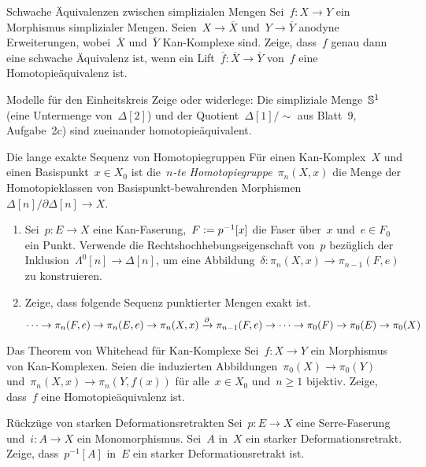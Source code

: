 \documentclass{uebblatt}
\begin{document}

\begin{aufgabe}{Schwache Äquivalenzen zwischen simplizialen Mengen}
Sei~$f : X \to Y$ ein Morphismus simplizialer Mengen. Seien~$X \to
\overline{X}$ und~$Y \to \overline{Y}$ anodyne Erweiterungen,
wobei~$\overline{X}$ und~$\overline{Y}$ Kan-Komplexe sind. Zeige, dass~$f$
genau dann eine schwache Äquivalenz ist, wenn ein Lift~$\overline{f} :
\overline{X} \to \overline{Y}$ von~$f$ eine Homotopieäquivalenz ist.
\end{aufgabe}

\begin{aufgabe}{Modelle für den Einheitskreis}
Zeige oder widerlege: Die simpliziale Menge~$\mathbb{S}^1$ (eine Untermenge
von~$\Delta[2]$) und der Quotient~$\Delta[1]/{\sim}$ aus Blatt~9, Aufgabe~2c)
sind zueinander homotopieäquivalent.
\end{aufgabe}

\begin{aufgabe}{Die lange exakte Sequenz von Homotopiegruppen}
Für einen Kan-Komplex~$X$ und einen Basispunkt~$x \in X_0$ ist die~\emph{$n$-te
Homotopiegruppe}~$\pi_n(X,x)$ die Menge der Homotopieklassen von
Basispunkt-bewahrenden Morphismen~$\Delta[n]/\partial \Delta[n] \to X$.
\begin{enumerate}
\item Sei~$p : E \to X$ eine Kan-Faserung,~$F \vcentcolon= p^{-1}[x]$ die Faser
über~$x$ und~$e \in F_0$ ein Punkt. Verwende die Rechtshochhebungseigenschaft
von~$p$ bezüglich der Inklusion~$\Lambda^0[n] \to \Delta[n]$, um eine
Abbildung~$\delta : \pi_n(X,x) \to \pi_{n-1}(F,e)$ zu konstruieren.
\item Zeige, dass folgende Sequenz punktierter Mengen exakt ist.
\[ \cdots \to \pi_n(F,e) \to \pi_n(E,e) \to \pi_n(X,x) \xrightarrow{\partial}
\pi_{n-1}(F,e) \to \cdots \to \pi_0(F) \to \pi_0(E) \to \pi_0(X) \]
\end{enumerate}
\end{aufgabe}
\vspace{-1em}

\begin{aufgabe}{Das Theorem von Whitehead für Kan-Komplexe}
Sei~$f : X \to Y$ ein Morphismus von Kan-Komplexen. Seien die induzierten
Abbildungen~$\pi_0(X) \to \pi_0(Y)$ und~$\pi_n(X,x) \to \pi_n(Y,f(x))$ für
alle~$x \in X_0$ und~$n \geq 1$ bijektiv. Zeige, dass~$f$ eine
Homotopieäquivalenz ist.
\end{aufgabe}

\begin{aufgabe}{Rückzüge von starken Deformationsretrakten}
Sei~$p : E \to X$ eine Serre-Faserung und~$i : A \to X$ ein Monomorphismus.
Sei~$A$ in~$X$ ein starker Deformationsretrakt. Zeige, dass~$p^{-1}[A]$ in~$E$
ein starker Deformationsretrakt ist.
\end{aufgabe}
\end{document}

